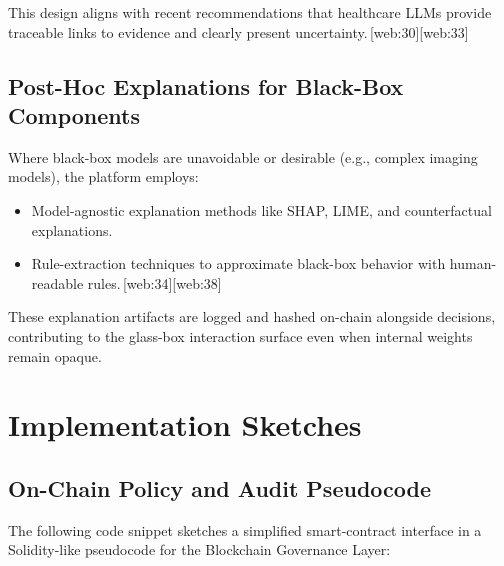 \documentclass[11pt]{article}
\begin{document}
This design aligns with recent recommendations that healthcare LLMs provide traceable links to evidence and clearly present uncertainty.\,[web:30][web:33]

\subsection{Post-Hoc Explanations for Black-Box Components}

Where black-box models are unavoidable or desirable (e.g., complex imaging models), the platform employs:
\begin{itemize}[nosep]
  \item Model-agnostic explanation methods like SHAP, LIME, and counterfactual explanations.
  \item Rule-extraction techniques to approximate black-box behavior with human-readable rules.\,[web:34][web:38]
\end{itemize}

These explanation artifacts are logged and hashed on-chain alongside decisions, contributing to the glass-box interaction surface even when internal weights remain opaque.

\section{Implementation Sketches}

\subsection{On-Chain Policy and Audit Pseudocode}

The following code snippet sketches a simplified smart-contract interface in a Solidity-like pseudocode for the Blockchain Governance Layer:
\end{document}

